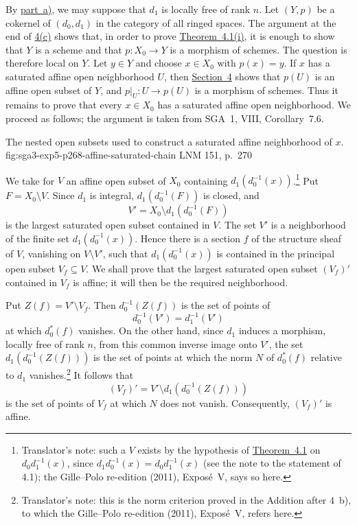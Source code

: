 
\label{proof:sga3-V-5-b-general}%
By \hyperref[par:sga3-V-5-a]{part~a)}, we may suppose that \(d_1\) is locally free of rank \(n\).
Let \((Y,p)\) be a cokernel of \((d_0,d_1)\) in the category of all
ringed spaces. The argument at the end of \hyperref[proof:sga3-V-4.1-c]{4(c)} shows that, in order to
prove \hyperref[thm:sga3-V-4.1-i]{Theorem~4.1(i)}, it is enough to show that \(Y\) is a scheme and
that \(p:X_0\to Y\) is a morphism of schemes. The question is therefore
local on \(Y\).
Let \(y\in Y\) and choose \(x\in X_0\) with \(p(x)=y\). If \(x\) has a
saturated affine open neighborhood \(U\), then \hyperref[sec:sga3-V-4]{Section~4} shows that
\(p(U)\) is an affine open subset of \(Y\), and
\(p|_U:U\to p(U)\) is a morphism of schemes. Thus it remains to prove
that every \(x\in X_0\) has a saturated affine open neighborhood. We
proceed as follows; the argument is taken from SGA~1, VIII,
Corollary~7.6.

  {The nested open subsets used to construct a saturated affine
  neighborhood of \(x\).}
  {fig:sga3-exp5-p268-affine-saturated-chain}
  {LNM 151, p.~270}

We take for \(V\) an affine open subset of \(X_0\) containing
\(d_1(d_0^{-1}(x))\).\footnote{Translator's note: such a \(V\) exists by the hypothesis of
\hyperref[thm:sga3-V-4.1]{Theorem~4.1} on \(d_0d_1^{-1}(x)\), since \(d_1d_0^{-1}(x)=d_0d_1^{-1}(x)\) (see the
note to the statement of 4.1); the Gille--Polo re-edition (2011), Exposé~V,
says so here.}
Put \(F=X_0\setminus V\). Since \(d_1\) is integral,
\(d_1(d_0^{-1}(F))\) is closed, and
\[
  V'=X_0\setminus d_1(d_0^{-1}(F))
\]
is the largest saturated open subset contained in \(V\). The set
\(V'\) is a neighborhood of the finite set
\(d_1(d_0^{-1}(x))\). Hence there is a section \(f\) of the structure
sheaf of \(V\), vanishing on \(V\setminus V'\), such that
\(d_1(d_0^{-1}(x))\) is contained in the principal open subset
\(V_f\subseteq V\). We shall prove that the largest saturated open
subset \((V_f)'\) contained in \(V_f\) is affine; it will then be the
required neighborhood.

Put \(Z(f)=V'\setminus V_f\). Then \(d_0^{-1}(Z(f))\) is the set of
points of
\[
  d_0^{-1}(V')=d_1^{-1}(V')
\]
at which \(d_0^\ast(f)\) vanishes. On the other hand, since \(d_1\) induces
a morphism, locally free of rank \(n\), from this common inverse image
onto \(V'\), the set \(d_1(d_0^{-1}(Z(f)))\) is the set of points at which
the norm \(N\) of \(d_0^\ast(f)\) relative to \(d_1\) vanishes.\footnote{Translator's note: this is the norm criterion proved in the Addition
after 4~b), to which the Gille--Polo re-edition (2011), Exposé~V, refers
here.} It follows that
\[
  (V_f)'=V'\setminus d_1(d_0^{-1}(Z(f)))
\]
is the set of points of \(V_f\) at which \(N\) does not vanish.
Consequently, \((V_f)'\) is affine.

